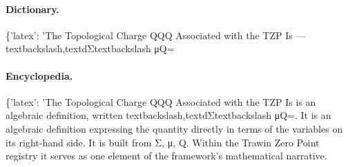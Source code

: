 \paragraph{Dictionary.}
\{'latex': 'The Topological Charge QQQ Associated with the TZP Is — textbackslash,textdΣtextbackslash μQ=

\paragraph{Encyclopedia.}
\{'latex': 'The Topological Charge QQQ Associated with the TZP Is is an algebraic definition, written textbackslash,textdΣtextbackslash μQ=. It is an algebraic definition expressing the quantity directly in terms of the variables on its right-hand side. It is built from Σ, μ, Q. Within the Trawin Zero Point registry it serves as one element of the framework's mathematical narrative.
